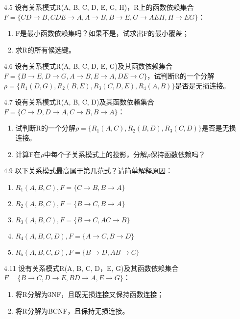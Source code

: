 \documentclass[]{ctexart}
\begin{document}
\begin{enumerate}
	\item[4.5] 设有关系模式R(A, B, C, D, E, G, H)，R上的函数依赖集合$F=\{CD \to B, CDE \to A, A \to B, B \to E, G \to AEH, H \to EG\}$：
	\begin{enumerate}
		\item F是最小函数依赖集吗？如果不是，试求出F的最小覆盖；
		\item 求R的所有候选键。
	\end{enumerate}
	

	\item[4.6] 设有关系模式R(A, B, C, D, E, G)及其函数依赖集合$F=\{B \to E, D \to G, A \to B, E \to A, DE \to C\}$，试判断R的一个分解$\rho=\{R_{1}(D, G), R_{2}(B, E), R_{3}(C, D, E), R_{4}(A, B)\}$是否是无损连接。
	
	
	\item[4.7] 设有关系模式R(A, B, C, D)及其函数依赖集合$F=\{C \to D, D \to A, C \to B, B \to A\}$：
	\begin{enumerate}
		\item 试判断R的一个分解$\rho=\{R_{1}(A, C), R_{2}(B, D), R_{3}(C, D)\}$是否是无损连接。
		\item 计算F在$\rho$中每个子关系模式上的投影，分解$\rho$保持函数依赖吗？
	\end{enumerate}
	

	\item[4.9] 以下关系模式最高属于第几范式？请简单解释原因：
	\begin{enumerate}
		\item $R_{1}(A, B, C), F=\{C \to B, B \to A\}$
		\item $R_{2}(A, B, C), F=\{B \to C, B \to A\}$
		\item $R_{3}(A, B, C), F=\{B \to C, AC \to B\}$
		\item $R_{4}(A, B, C, D), F=\{A \to C, B \to D\}$
		\item $R_{5}(A, B, C, D), F=\{B \to D, AB \to C\}$
	\end{enumerate}
	

	\item[4.11] 设有关系模式R(A, B, C, D，E, G)及其函数依赖集合$F=\{B \to C, D \to E, BD \to A, E \to G\}$：
	\begin{enumerate}
		\item 将R分解为3NF，且既无损连接又保持函数连接；
		\item 将R分解为BCNF，且保持无损连接。
	\end{enumerate}
	
\end{enumerate}
\end{document}
